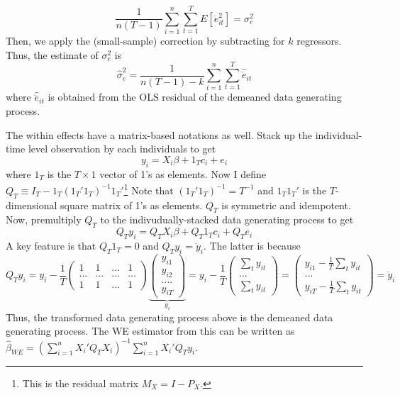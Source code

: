 \documentclass[12pt]{article}
\theoremstyle{definition}
\theoremstyle{property}
\theoremstyle{assumption}
\theoremstyle{example}
\theoremstyle{comment}
\begin{document}
\[
\frac{1}{n(T-1)}\sum_{i=1}^n\sum_{t=1}^TE[\ddot{e}_{it}^2]=\sigma_e^2
\]
Then, we apply the (small-sample) correction by subtracting for $k$ regressors. Thus, the estimate of $\sigma_e^2$ is
\[
\widehat{\sigma}_e^2= \frac{1}{n(T-1)-k}\sum_{i=1}^n\sum_{t=1}^T\widehat{\ddot{e}}_{it}
\]
where $\widehat{\ddot{e}}_{it}$ is obtained from the OLS residual of the demeaned data generating process. 
\par The within effects have a matrix-based notations as well. Stack up the individual-time level observation by each individuals to get
\[
y_i = X_i\beta+ 1_Tc_i + e_i
\]
where $1_T$ is the $T\times 1$ vector of 1's as elements. Now I define $Q_T\equiv I_T-1_T(1_T'1_T)^{-1}1_T'$\footnote{This is the residual matrix $M_X = I -P_X$.  } Note that $(1_T'1_T)^{-1}=T^{-1}$ and $1_T1_T'$ is the $T$-dimensional square matrix of 1's as elements. $Q_T$ is symmetric and idempotent. Now, premultiply $Q_T$ to the indivudually-stacked data generating process to get
\[
Q_Ty_i = Q_TX_i\beta+ Q_T1_Tc_i + Q_Te_i
\]
A key feature is that $Q_T1_T = 0$ and $Q_Ty_i = \ddot{y}_i$. The latter is because
\[
Q_T{y}_i={y}_i-\frac{1}{T}\begin{pmatrix} 1 & 1& ...& 1 \\ ... & ...& ...& ... \\1 & 1& ...& 1  \end{pmatrix}\underbrace{\begin{pmatrix}y_{i1}\\ y_{i2}\\ .... \\y_{iT}\end{pmatrix}}_{y_i}={y}_i-\frac{1}{T}\begin{pmatrix}\sum_t y_{it}\\ ...\\\sum_t y_{it}\end{pmatrix}=\begin{pmatrix}y_{i1}-\frac{1}{T}\sum_t y_{it}\\ ... \\y_{iT}-\frac{1}{T}\sum_t y_{it}\end{pmatrix}={\ddot{y}}_i
\]
Thus, the transformed data generating process above is the demeaned data generating process. The WE estimator from this can be written as $ \hat{\beta}_{WE}=\left(\sum_{i=1}^n{X}_i'Q_T{X}_i\right)^{-1}\sum_{i=1}^n{X}_i'Q_T{y}_i$.
\end{document}
